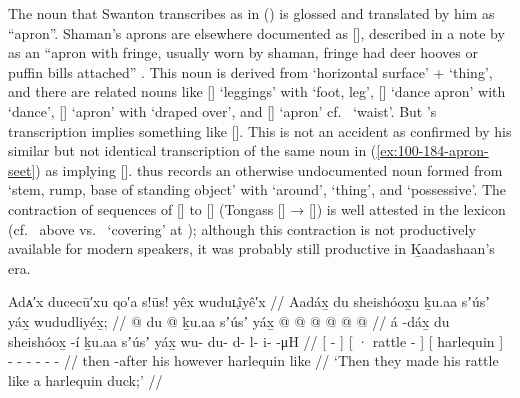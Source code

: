 The noun that Swanton transcribes as  in (\lastx) is glossed and translated by him as “apron”.
Shaman’s aprons are elsewhere documented as  [], described in a note by \citeauthor{leer:1973} as an “apron with fringe, usually worn by shaman, fringe had deer hooves or puffin bills attached” \parencite[02/103]{leer:1973}.
This noun  is derived from  ‘horizontal surface’ +  ‘thing’, and there are related nouns like  [] ‘leggings’ with  ‘foot, leg’,  [] ‘dance apron’ with  ‘dance’,  [] ‘apron’ with  ‘draped over’, and  [] ‘apron’ cf.\  ‘waist’.
But \citeauthor{swanton:1909}’s transcription  implies something like  [].
This is not an accident as confirmed by his similar but not identical transcription of the same noun in (\ref{ex:100-184-apron-seet}) as  implying  [].
\citeauthor{swanton:1909} thus records an otherwise undocumented noun formed from  ‘stem, rump, base of standing object’ \parencite[f04/116]{leer:1973} with  ‘around’,  ‘thing’, and  ‘possessive’.
The contraction of sequences of [] to [] (Tongass [] → []) is well attested in the lexicon (cf.\  above vs.\  ‘covering’ at \cite[02/103]{leer:1973}); although this contraction is not productively available for modern speakers, it was probably still productive in Ḵaadashaan’s era.

\ex\label{ex:100-183-rattle-harlequin}%
%
\begingl
	\glpreamble	Adᴀ′x ducecū′xu qo′a s!ūs! yêx wuduʟ̣îyê′x //
	\glpreamble	Aadáx̱ du sheishóox̱u ḵu.aa sʼúsʼ yáx̱ wududliyéx̱; //
	\gla	{}  @ {} {}
		{} du  @ {} {} ḵu.aa
		{} sʼúsʼ yáx̱ {}
		 @ {} @ {} @ {} @ {} @ {} @ {} //
	\glb	{} á -dáx̱ {}
		{} du sheishóox̱ -í {} ḵu.aa
		{} sʼúsʼ yáx̱ {}
		wu- du- d- l- i-  -μH //
	\glc	{}[  - {}]
		{}[ · rattle - {}] 
		{}[ harlequin  {}]
		- - - - -  - //
	\gld	{} then -after {} 
		{} his  {} {} however
		{} harlequin like {}
		 {} {} {} {} {} {} {} //
	\glft	‘Then they made his rattle like a harlequin duck;’
		//
\endgl
\xe

